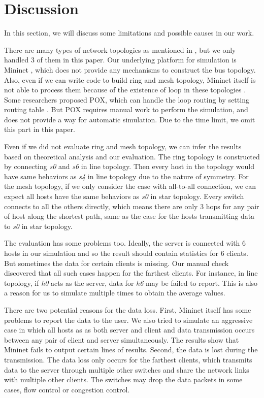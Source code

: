 \section{Discussion} \label{sec:discussion}

In this section, we will discuss some limitations and possible causes in our work.

There are many types of network topologies as mentioned in \cite{NetworkTopo:wiki},
but we only handled 3 of them in this paper. Our underlying platform for simulation
is Mininet \cite{Mininet:official}, which does not provide any mechanisms to construct
the bus topology. Also, even if we can write code to build ring and mesh topology,
Mininet itself is not able to process them because of the existence of loop in these
topologies \cite{MininetFAQ:web}. Some researchers proposed POX, which can handle the
loop routing by setting routing table \cite{POX:web}. But POX requires manual work 
to perform the simulation, and does not provide a way for automatic simulation. 
Due to the time limit, we omit this part in this paper.

Even if we did not evaluate ring and mesh topology, we can infer the results based on 
theoretical analysis and our evaluation. The ring topology is constructed by connecting
{\it s0} and {\it s6} in line topology. Then every host in the topology would have same 
behaviors as {\it s4} in line topology due to the nature of symmetry. 
For the mesh topology, if we only consider the case with all-to-all connection, we can
expect all hosts have the same behaviors as {\it s0} in star topology. Every switch 
connects to all the others directly, which means there are only 3 hops for any pair
of host along the shortest path, same as the case for the hosts transmitting data to 
{\it s0} in star topology. 

The evaluation has some problems too. Ideally, the server is connected with 6 hosts in
our simulation and so the result should contain statistics for 6 clients. But sometimes
the data for certain clients is missing. Our manual check discovered that all such cases 
happen for the farthest clients. For instance, in line topology, if {\it h0} acts as the 
server, data for {\it h6} may be failed to report. This is also a reason for us to 
simulate multiple times to obtain the average values. 

There are two potential reasons for the data loss. First, Mininet itself has some problems 
to report the data to the user. We also tried to simulate an aggressive case in which all 
hosts as as both server and client and data transmission occurs between any pair of 
client and server simultaneously. The results show that Mininet fails to output certain lines
of results. Second, the data is lost during the transmission. The data loss only occurs for 
the farthest clients, which transmits data to the server through multiple other switches and 
share the network links with multiple other clients. 
The switches may drop the data packets in some cases, \eg flow control or congestion control.

